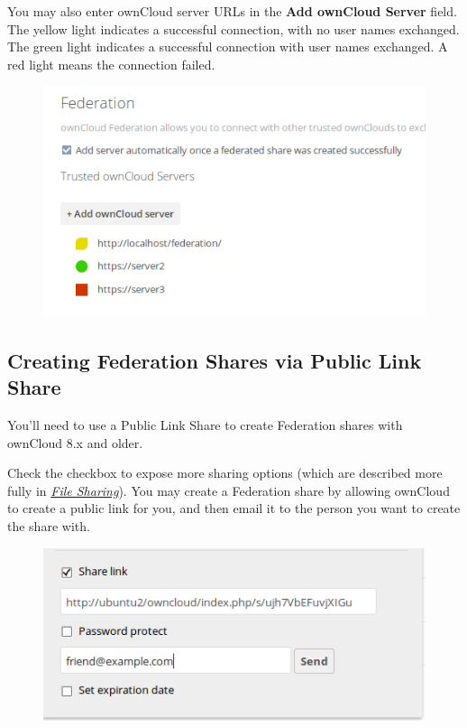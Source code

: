 \documentclass[letterpaper,10pt,english]{sphinxmanual}
\begin{document}
You may also enter ownCloud server URLs in the \textbf{Add ownCloud Server} field.
The yellow light indicates a successful connection, with no user names
exchanged. The green light indicates a successful connection with user names
exchanged. A red light means the connection failed.
\begin{figure}[htbp]
\centering

\includegraphics{federation-1.png}
\end{figure}


\subsection{Creating Federation Shares via Public Link Share}
\label{configuration_files/federated_cloud_sharing_configuration:label-public-link-share}\label{configuration_files/federated_cloud_sharing_configuration:creating-federation-shares-via-public-link-share}
You'll need to use a Public Link Share to create Federation shares with
ownCloud 8.x and older.

Check the  checkbox to expose more sharing options (which are
described more fully in {\hyperref[configuration_files/file_sharing_configuration::doc]{\emph{File Sharing}}}). You may create a
Federation share by allowing ownCloud to create a public link for you, and then
email it to the person you want to create the share with.
\begin{figure}[htbp]
\centering

\includegraphics{create_public_share-6.png}
\end{figure}
\end{document}
